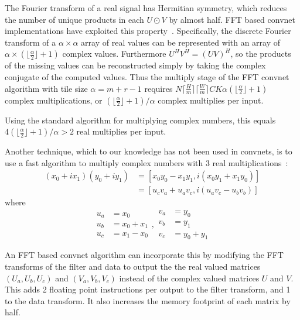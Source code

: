 \documentclass[10pt,twocolumn,letterpaper]{article}
\begin{document}
The Fourier transform of a real signal has Hermitian symmetry, which reduces the number of unique products in each $U \odot V$ by almost half. FFT based convnet implementations have exploited this property~\cite{DBLP:journals/corr/MathieuHL13,DBLP:journals/corr/VasilacheJMCPL14}. Specifically, the discrete Fourier transform of a $\alpha\times \alpha$ array of real values can be represented with an array of $\alpha \times (\lfloor \frac{\alpha}{2} \rfloor + 1)$ complex values. Furthermore $U^H V^H = (UV)^H$, so the products of the missing values can be reconstructed simply by taking the complex conjugate of the computed values. Thus the multiply stage of the FFT convnet algorithm with tile size $\alpha = m + r - 1$ requires $N \lceil \frac{H}{m} \rceil \lceil \frac{W}{m} \rceil C K \alpha (\lfloor \frac{\alpha}{2} \rfloor + 1)$ complex multiplications, or $(\lfloor \frac{\alpha}{2} \rfloor + 1)/\alpha$ complex multiplies per input. 

Using the standard algorithm for multiplying complex numbers, this equals $4 (\lfloor \frac{\alpha}{2} \rfloor + 1)/\alpha > 2$ real multiplies per input.

Another technique, which to our knowledge has not been used in convnets, is to use a fast algorithm to multiply complex numbers with 3 real multiplications~\cite{winograd1980arithmetic}:
\begin{equation}
\begin{split}
(x_0 + i x_1)(y_0 + i y_1) &= \left[x_0 y_0 - x_1 y_1, i(x_0 y_1 + x_1 y_0)\right] \\
&= \left[u_c v_a + u_a v_c, i (u_a v_c - u_b v_b)\right]
\end{split}
\end{equation}
where
\begin{equation}
\begin{split}
u_a &= x_0 \\
u_b &= x_0 + x_1 \\
u_c &= x_1 - x_0
\end{split},
\begin{split}
v_a &= y_0 \\
v_b &= y_1 \\
v_c &= y_0 + y_1
\end{split}
\end{equation}

An FFT based convnet algorithm can incorporate this by modifying the FFT transforms of the filter and data to output the the real valued matrices $(U_a, U_b, U_c)$ and $(V_a, V_b, V_c)$ instead of the complex valued matrices $U$ and $V$. This adds 2 floating point instructions per output to the filter transform, and 1 to the data transform. It also increases the memory footprint of each matrix by half.
\end{document}
